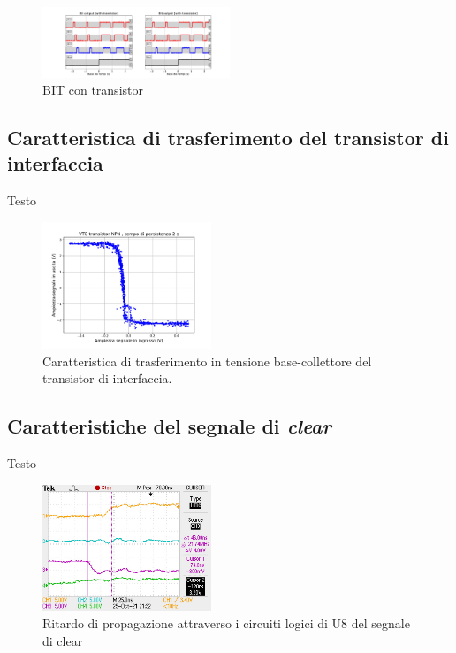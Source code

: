 \documentclass[journal]{IEEEtran}
\begin{document}
\begin{figure}[H]%
\begin{center}
\includegraphics[trim = {570 0 0 0}, clip, width=0.50\textwidth]{analysis/output/cumulative_BIT_with_transistor.pdf}
\caption{BIT con transistor}
\label{fig:BIT_with_transistor}
\end{center}
\end{figure}




\subsection{Caratteristica di trasferimento del transistor di interfaccia}
Testo

\begin{figure}[H]%
\begin{center}
\includegraphics[width=0.45\textwidth]{analysis/output/NPN-XY.pdf}
\caption{Caratteristica di trasferimento in tensione base-collettore del transistor di interfaccia.}
\label{fig:inverter_ring_xy}
\end{center}
\end{figure}


\subsection{Caratteristiche del segnale di \textit{clear}}
Testo

\begin{figure}[H]%
\begin{center}
\includegraphics[width=0.45\textwidth]{data-source/25-10-21/DeltaT-clear.JPG}
\caption{Ritardo di propagazione attraverso i circuiti logici di U8 del segnale di clear}
\label{fig:inverter_ring_xy}
\end{center}
\end{figure}
\end{document}
